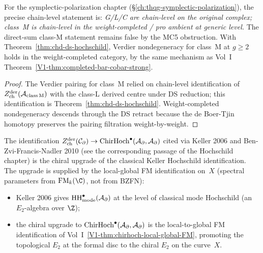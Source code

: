 \begin{proposition}
\label{prop:uhf-symplectic-polarization}
For the symplectic-polarization chapter
(\S\ref*{ch:thqg-symplectic-polarization}), the precise chain-level
statement is:
\emph{G/L/C are chain-level on the original complex; class~M is
chain-level in the weight-completed / pro ambient at generic level.}
The direct-sum class-M statement remains false by the MC5 obstruction.
With Theorem~\ref*{thm:chd-ds-hochschild}, Verdier nondegeneracy for
class~M at $g \geq 2$ holds in the weight-completed category, by the
same mechanism as Vol~I
Theorem~\ref*{V1-thm:completed-bar-cobar-strong}.
\end{proposition}

\begin{proof}
The Verdier pairing for class~M relied on chain-level
identification of
$Z^{\mathrm{der}}_{\mathrm{ch}}(\mathcal{A}_{\mathrm{class\,M}})$ with the class-L derived centre
under DS reduction; this identification is
Theorem~\ref*{thm:chd-ds-hochschild}. Weight-completed
nondegeneracy descends through the DS retract because the de
Boer-Tjin homotopy preserves the pairing filtration weight-by-weight.
\end{proof}

\begin{proposition}
\label{prop:uhf-kel06-chirality}
The identification $Z^{\mathrm{der}}_{\mathrm{ch}}(\mathcal{C}_\partial) \to \mathrm{ChirHoch}^\bullet(\mathcal{A}_\partial, \mathcal{A}_\partial)$
cited via Keller 2006 and Ben-Zvi-Francis-Nadler 2010
(see the corresponding passage of the Hochschild chapter)
is the chiral upgrade of the
classical Keller Hochschild identification. The upgrade is
supplied by the local-global FM identification on~$X$
\textup{(}spectral parameters from $\FM_k(\C)$, not from
BZFN\textup{)}:
\begin{itemize}
\item Keller 2006 gives $\mathrm{HH}^\bullet_{\mathrm{mode}}(\mathcal{A}_\partial)$
 at the level of classical mode Hochschild \textup{(}an $E_2$-algebra
 over $\Z$\textup{)};
\item the chiral upgrade to $\mathrm{ChirHoch}^\bullet(\mathcal{A}_\partial, \mathcal{A}_\partial)$
 is the local-to-global FM identification of
 Vol~I~\ref*{V1-thm:chirhoch-local-global-FM}, promoting the
 topological $E_2$ at the formal disc to the chiral $E_2$ on
 the curve~$X$.
\end{itemize}
\end{proposition}

